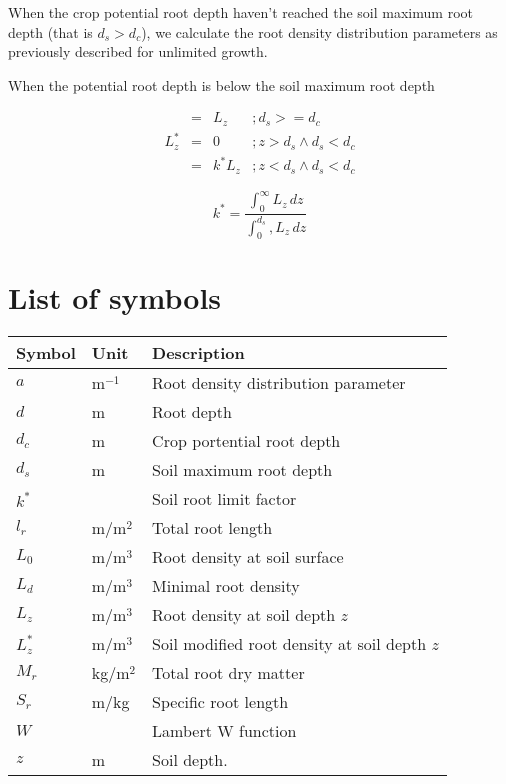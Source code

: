 \documentclass[a4paper,11pt,twoside]{article}
\begin{document}
When the crop potential root depth haven't reached the soil maximum
root depth (that is $d_s > d_c$), we calculate the root density
distribution parameters as previously described for unlimited growth.

When the potential root depth is below the soil maximum root depth

\begin{equation}
  \begin{array}{rcll}
           &=& L_z     &; d_s >= d_c \\
     L_z^* &=& 0       &; z > d_s \wedge d_s < d_c \\
           &=& k^* L_z &; z < d_s \wedge d_s < d_c 
  \end{array}
  \label{eq:limited-depth}
\end{equation}

\begin{equation}
  k^* = \frac{\int_0^{\infty} L_z \, dz}{\int_0^{d_s}, L_z \, dz}
\end{equation}

\section*{List of symbols}

\begin{tabular}{lll}
Symbol & Unit & Description\\\hline
$a$     & m$^{-1}$ & Root density distribution parameter\\
$d$     & m       & Root depth\\
$d_c$   & m       & Crop portential root depth\\
$d_s$   & m       & Soil maximum root depth\\
$k^*$   &         & Soil root limit factor\\
$l_r$   & m/m$^2$ & Total root length\\
$L_0$   & m/m$^3$ & Root density at soil surface\\
$L_d$   & m/m$^3$ & Minimal root density\\
$L_z$   & m/m$^3$ & Root density at soil depth $z$\\
$L_z^*$ & m/m$^3$ & Soil modified root density at soil depth $z$\\
$M_r$   & kg/m$^2$& Total root dry matter\\
$S_r$   & m/kg    & Specific root length\\
$W$     &         & Lambert W function\\
$z$     & m       & Soil depth. \\
\end{tabular}



\end{document}
